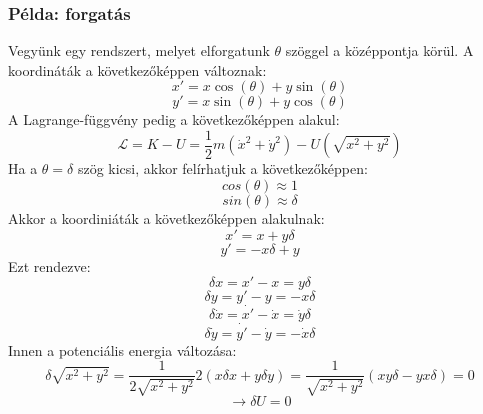 \documentclass[../main.tex]{subfiles}
\begin{document}
\subsubsection*{Példa: forgatás}
Vegyünk egy rendszert, melyet elforgatunk $\theta$ szöggel a középpontja körül. A koordináták a következőképpen változnak:
\begin{equation}
    x' = x \cos(\theta) + y \sin(\theta)
\end{equation}
\begin{equation}
    y' = x \sin(\theta) + y \cos(\theta)
\end{equation}
A Lagrange-függvény pedig a következőképpen alakul:
\begin{equation}
    \mathcal{L} = K - U = \frac{1}{2}m(\dot{x}^2 + \dot{y}^2) - U(\sqrt{x^2 + y^2})
\end{equation}
Ha a $\theta = \delta$ szög kicsi, akkor felírhatjuk a következőképpen:
\begin{equation}
        cos(\theta) \approx 1
\end{equation}
\begin{equation}
        sin(\theta) \approx \delta
\end{equation}
Akkor a koordiniáták a következőképpen alakulnak:
\begin{equation}
    x' = x + y \delta
\end{equation}
\begin{equation}
    y' = -x \delta + y
\end{equation}
Ezt rendezve:
\begin{equation}
    \delta x = x' - x = y \delta
\end{equation}
\begin{equation}
    \delta y = y' - y = - x \delta
\end{equation}
\begin{equation}
    \delta \dot{x} = \dot{x'} - \dot{x} = \dot{y} \delta
\end{equation}
\begin{equation}
    \delta \dot{y} = \dot{y'} - \dot{y} = - \dot{x} \delta
\end{equation}
Innen a potenciális energia változása:
\begin{equation}
    \delta \sqrt{x^2 + y^2} = \frac{1}{2\sqrt{x^2 + y^2}} 2(x \delta x + y \delta y) = \frac{1}{\sqrt{x^2 + y^2}} (xy \delta - yx \delta) = 0
\end{equation}
\begin{equation}
    \rightarrow \delta U = 0
\end{equation}
\end{document}
